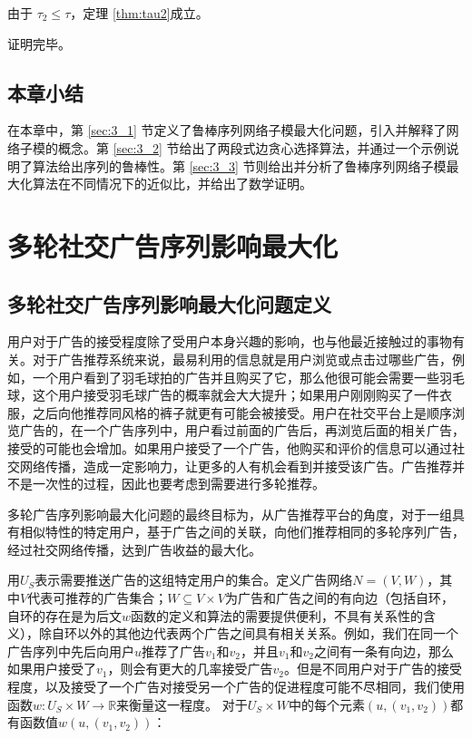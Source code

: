 由于 $\tau_2 \le \tau$，定理 \ref{thm:tau2}成立。

\noindent 证明完毕。


\section{本章小结}
在本章中，第 \ref{sec:3_1} 节定义了鲁棒序列网络子模最大化问题，引入并解释了网络子模的概念。第 \ref{sec:3_2} 节给出了两段式边贪心选择算法，并通过一个示例说明了算法给出序列的鲁棒性。第 \ref{sec:3_3} 节则给出并分析了鲁棒序列网络子模最大化算法在不同情况下的近似比，并给出了数学证明。


\chapter{多轮社交广告序列影响最大化}

\section{多轮社交广告序列影响最大化问题定义}
\label{sec:def}
用户对于广告的接受程度除了受用户本身兴趣的影响，也与他最近接触过的事物有关。对于广告推荐系统来说，最易利用的信息就是用户浏览或点击过哪些广告，例如，一个用户看到了羽毛球拍的广告并且购买了它，那么他很可能会需要一些羽毛球，这个用户接受羽毛球广告的概率就会大大提升；如果用户刚刚购买了一件衣服，之后向他推荐同风格的裤子就更有可能会被接受。用户在社交平台上是顺序浏览广告的，在一个广告序列中，用户看过前面的广告后，再浏览后面的相关广告，接受的可能也会增加。如果用户接受了一个广告，他购买和评价的信息可以通过社交网络传播，造成一定影响力，让更多的人有机会看到并接受该广告。广告推荐并不是一次性的过程，因此也要考虑到需要进行多轮推荐。

多轮广告序列影响最大化问题的最终目标为，从广告推荐平台的角度，对于一组具有相似特性的特定用户，基于广告之间的关联，向他们推荐相同的多轮序列广告，经过社交网络传播，达到广告收益的最大化。

用$U_S$表示需要推送广告的这组特定用户的集合。定义广告网络$N=(V,W)$，其中$V$代表可推荐的广告集合；$W\subseteq V \times V$为广告和广告之间的有向边（包括自环，自环的存在是为后文$w$函数的定义和算法的需要提供便利，不具有关系性的含义），除自环以外的其他边代表两个广告之间具有相关关系。例如，我们在同一个广告序列中先后向用户$u$推荐了广告$v_1$和$v_2$，并且$v_1$和$v_2$之间有一条有向边，那么如果用户接受了$v_1$，则会有更大的几率接受广告$v_2$。但是不同用户对于广告的接受程度，以及接受了一个广告对接受另一个广告的促进程度可能不尽相同，我们使用函数$w:U_S \times W \to \mathbb{R}$来衡量这一程度。 对于$U_S \times W$中的每个元素$(u,(v_1,v_2))$都有函数值$w(u,(v_1,v_2))$：

